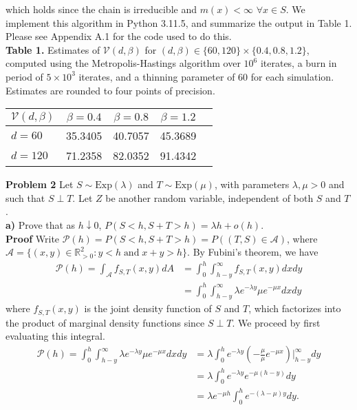 \documentclass[11pt, letterpaper]{article}
\newcommand{\mbb}[1]{\mathbb{#1}}
\newcommand{\mc}[1]{\mathcal{#1}}
\begin{document}
    which holds since the chain is irreducible and $m(x)<\infty$ $\forall x\in S$. We implement this algorithm in Python 3.11.5, and summarize the output in Table 1. Please see Appendix A.1
    for the code used to do this.\\[10pt]
    {\bf Table 1.} Estimates of $\mc{V}(d,\beta)$ for $(d,\beta)\in\{60, 120\}\times\{0.4,0.8,1.2\}$, computed using the Metropolis-Hastings algorithm over $10^6$ iterates, a burn in period of $5\times 10^3$
    iterates, and a thinning parameter of $60$ for each simulation. Estimates are rounded to four points of precision.
    \begin{center}
        \begin{tabular}{@{}l|c|c|c|c@{}}\toprule
            $\mc{V}(d,\beta)$ & $\beta=0.4$ & $\beta=0.8$ & $\beta=1.2$ \\\midrule
            $d=60$ & 35.3405 & 40.7057 & 45.3689\\\midrule
            $d=120$ & 71.2358 & 82.0352 & 91.4342\\
            \bottomrule
        \end{tabular}
    \end{center}
    {\bf Problem 2} Let $S\sim\text{Exp}(\lambda)$ and $T\sim\text{Exp}(\mu)$, with parameters $\lambda,\mu>0$ and such that $S\perp T$. Let $Z$ be another random variable, independent
    of both $S$ and $T$.\\[10pt]
    {\bf a)} Prove that as $h\downarrow 0$, $P(S<h,S+T>h)=\lambda h+o(h)$.\\[10pt]
    {\bf Proof} Write $\mc{P}(h)=P(S<h,S+T>h)=P((T,S)\in\mc{A})$, where $\mc{A}=\{(x,y)\in\mbb{R}_{>0}^2:y<h\;\text{and}\;x+y>h\}$. By Fubini's theorem, we have
    \begin{align*}
        \mc{P}(h)=\int_\mc{A}f_{S,T}(x,y)dA&=\int_0^h\int_{h-y}^\infty f_{S,T}(x,y)dxdy\\
        &=\int_0^h\int_{h-y}^\infty \lambda e^{-\lambda y}\mu e^{-\mu x}dxdy\tag{factorization theorem}
    \end{align*}
    where $f_{S,T}(x,y)$ is the joint density function of $S$ and $T$, which factorizes into the product of marginal density functions since $S\perp T$. We proceed by first evaluating this integral.
    \begin{align*}
        \mc{P}(h)=\int_0^h\int_{h-y}^\infty \lambda e^{-\lambda y}\mu e^{-\mu x}dxdy
        &=\lambda\int_0^he^{-\lambda y}\left(-\frac{\mu}{\mu}e^{-\mu x}\right)\bigg|_{h-y}^\infty dy\\
        &=\lambda\int_0^he^{-\lambda y}e^{-\mu(h-y)}dy\\
        &=\lambda e^{-\mu h}\int_0^he^{-(\lambda-\mu)y}dy.\tag{1}
    \end{align*}
\end{document}
